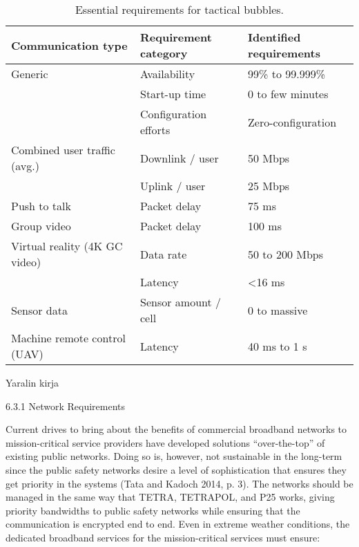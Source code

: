 \documentclass[english, 12pt, a4paper, elec, utf8, a-1b, online]{aaltothesis}
\begin{document}
\begin{table}[]
  \centering
  \caption{Essential requirements for tactical bubbles.}
  \begin{tabular}{@{}lll@{}}
  \toprule
  Communication type            & Requirement category  & Identified requirements \\ \midrule
  Generic                       & Availability          & 99\% to 99.999\%        \\
                                & Start-up time         & 0 to few minutes        \\
                                & Configuration efforts & Zero-configuration      \\
  Combined user traffic (avg.)  & Downlink / user       & 50 Mbps                 \\
                                & Uplink / user         & 25 Mbps                 \\
  Push to talk                  & Packet delay          & 75 ms                   \\
  Group video                   & Packet delay          & 100 ms                  \\
  Virtual reality (4K GC video) & Data rate             & 50 to 200 Mbps          \\
                                & Latency               & \textless 16 ms         \\
  Sensor data                   & Sensor amount / cell  & 0 to massive            \\
  Machine remote control (UAV)  & Latency               & 40 ms to 1 s            \\ \bottomrule
  \end{tabular}
  \label{table-mcx-requirements}
\end{table}

Yaralin kirja

6.3.1 Network Requirements

Current drives to bring about the benefits of commercial broadband networks to mission-critical service providers have developed solutions “over-the-top” of existing public networks.
Doing so is, however, not sustainable in the long-term since the public safety networks desire a level of sophistication that ensures they get priority in the systems (Tata and Kadoch 2014, p.
3).
The networks should be managed in the same way that TETRA, TETRAPOL, and P25 works, giving priority bandwidths to public safety networks while ensuring that the communication is encrypted end to end.
Even in extreme weather conditions, the dedicated broadband services for the mission-critical services must ensure:
\end{document}
